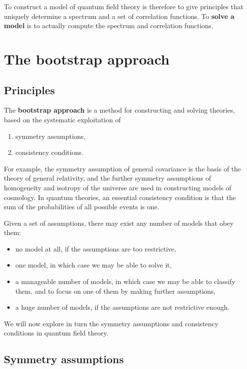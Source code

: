 \documentclass[12pt, a4paper, notitlepage, twoside]{report}
\numberwithin{equation}{section}
\theoremstyle{break}
\begin{document}
To construct a model of quantum field theory is therefore to give principles that uniquely determine a spectrum and a set of correlation functions.
To \textbf{\boldmath solve a model} is to actually compute the spectrum and correlation functions. 

\section{The bootstrap approach}

\subsection{Principles \label{secprin}}

The \textbf{\boldmath bootstrap approach} is a method for constructing and solving theories, based on the systematic exploitation of 
\begin{enumerate}
 \item symmetry assumptions,
 \item consistency conditions.
\end{enumerate}
For example, the symmetry assumption of general covariance is the basis of the theory of general relativity, and the further symmetry assumptions of homogeneity and isotropy of the universe are used in constructing models of cosmology.
In quantum theories, an essential consistency condition is that the sum of the probabilities of all possible events is one. 

Given a set of assumptions, there may exist any number of models that obey them:
\begin{itemize}
 \item no model at all, if the assumptions are too restrictive,
\item one model, in which case we may be able to solve it,
\item a manageable number of models, in which case we may be able to classify them, and to focus on one of them by making further assumptions,
\item a huge number of models, if the assumptions are not restrictive enough.
\end{itemize}
We will now explore in turn the symmetry assumptions and consistency conditions in quantum field theory. 

\subsection{Symmetry assumptions \label{secsa}}
\end{document}

